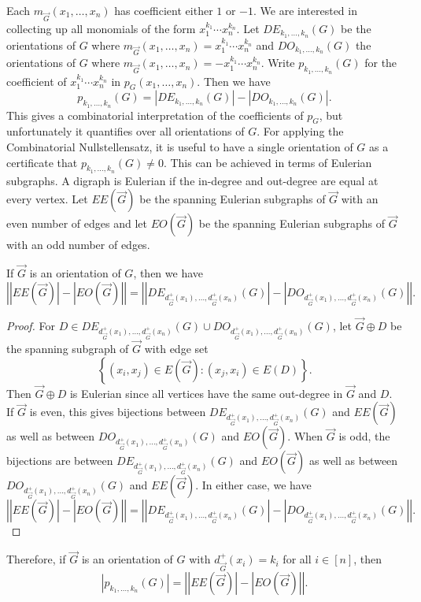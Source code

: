 \documentclass{tufte-book} %
\theoremstyle{plain}
\newcommand{\setb}[3]{\left\{ #1 \in #2 : #3 \right\}}
\newcommand{\card}[1]{\left|#1\right|}
\newcommand{\irange}[1]{\left[#1\right]}
\begin{document}
Each $m_{\vec{G}}(x_1,\ldots, x_n)$ has coefficient either $1$ or $-1$.   
We are interested in collecting up all monomials of the form $x_1^{k_1}\cdots x_n^{k_n}$.  Let $DE_{k_1,\ldots, k_n}(G)$ be the orientations of $G$ 
where $m_{\vec{G}}(x_1,\ldots, x_n) = x_1^{k_1}\cdots x_n^{k_n}$ and $DO_{k_1,\ldots, k_n}(G)$ the orientations of $G$ where $m_{\vec{G}}(x_1,\ldots, x_n) = -x_1^{k_1}\cdots x_n^{k_n}$.  
Write $p_{k_1, \ldots, k_n}(G)$ for the coefficient of $x_1^{k_1}\cdots x_n^{k_n}$ in $p_G(x_1,\ldots,x_n)$.  Then we have
\[p_{k_1, \ldots, k_n}(G) = |DE_{k_1,\ldots, k_n}(G)| - |DO_{k_1,\ldots, k_n}(G)|.\]
This gives a combinatorial interpretation of the coefficients of $p_G$, but unfortunately it quantifies over all orientations of $G$.  
For applying the Combinatorial Nullstellensatz, it is useful to have a single orientation of $G$ as a certificate that $p_{k_1, \ldots, k_n}(G) \ne 0$.  
This can be achieved in terms of Eulerian subgraphs.  A digraph is Eulerian if the in-degree and out-degree are equal at every vertex.  
Let $EE(\vec{G})$ be the spanning Eulerian subgraphs of $\vec{G}$ with an even number of edges and let $EO(\vec{G})$ be the spanning Eulerian subgraphs of $\vec{G}$ with an odd number of edges.  

\begin{EulerianOrientationsLemma}
If $\vec{G}$ is an orientation of $G$, then we have
\[\card{|EE(\vec{G})| - |EO(\vec{G})|} = \card{|DE_{d_{\vec{G}}^+(x_1), \ldots, d_{\vec{G}}^+(x_n)}(G)|- |DO_{d_{\vec{G}}^+(x_1), \ldots, d_{\vec{G}}^+(x_n)}(G)|}.\]
\end{EulerianOrientationsLemma}
\begin{proof}
	For $D \in DE_{d_{\vec{G}}^+(x_1), \ldots, d_{\vec{G}}^+(x_n)}(G) \cup DO_{d_{\vec{G}}^+(x_1), \ldots, d_{\vec{G}}^+(x_n)}(G)$, let $\vec{G} \oplus D$ be the spanning subgraph of $\vec{G}$ with edge set 
	\[\setb{(x_i,x_j)}{E(\vec{G})}{(x_j,x_i) \in E(D)}.\]
	Then $\vec{G} \oplus D$ is Eulerian since all vertices have the same out-degree in $\vec{G}$ and $D$.  If $\vec{G}$ is even, this gives bijections between $DE_{d_{\vec{G}}^+(x_1), \ldots, d_{\vec{G}}^+(x_n)}(G)$ and $EE(\vec{G})$ as well as between $DO_{d_{\vec{G}}^+(x_1), \ldots, d_{\vec{G}}^+(x_n)}(G)$ and $EO(\vec{G})$.  When $\vec{G}$ is odd, the bijections are between $DE_{d_{\vec{G}}^+(x_1), \ldots, d_{\vec{G}}^+(x_n)}(G)$ and $EO(\vec{G})$ as well as between $DO_{d_{\vec{G}}^+(x_1), \ldots, d_{\vec{G}}^+(x_n)}(G)$ and $EE(\vec{G})$.  In either case, we have
\[\card{|EE(\vec{G})| - |EO(\vec{G})|} = \card{|DE_{d_{\vec{G}}^+(x_1), \ldots, d_{\vec{G}}^+(x_n)}(G)|- |DO_{d_{\vec{G}}^+(x_1), \ldots, d_{\vec{G}}^+(x_n)}(G)|}.\]
\end{proof} 
Therefore, if $\vec{G}$ is an orientation of $G$ with $d_{\vec{G}}^+(x_i) = k_i$ for all $i \in \irange{n}$, then
\[|p_{k_1, \ldots, k_n}(G)| = \card{|EE(\vec{G})| - |EO(\vec{G})|}.\]
\end{document}
